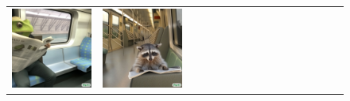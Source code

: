 \begin{figure}[ht!]
\begin{adjustwidth}{-0.8in}{-0.5in}
\begin{tabular}{cccccccccccccccccccc}
\multicolumn{3}{c}{\includegraphics[width=\twobytwocolwidth\textwidth]{figures/cherries/frogs_river.jpg}} &
\multicolumn{3}{c}{\includegraphics[width=\twobytwocolwidth\textwidth]{figures/cherries/raccoon_city.jpg}} &&

\end{tabular}
\end{adjustwidth}
\end{figure}
